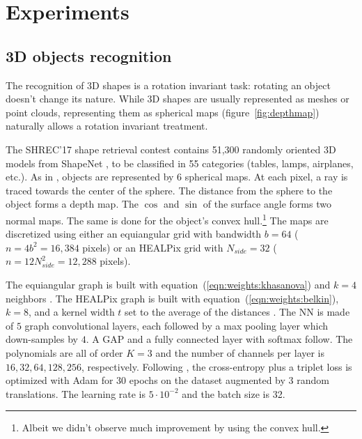 \documentclass{article} %
\newcommand{\todo}[1]{{\color[rgb]{.6,.1,.6}{#1}}}
\newcommand{\figref}[1]{figure~\ref{fig:#1}}
\newcommand{\eqnref}[1]{equation~(\ref{eqn:#1})}
\begin{document}
\section{Experiments}


\subsection{3D objects recognition} \label{sec:exp:shrec}

The recognition of 3D shapes is a rotation invariant task: rotating an object doesn't change its nature.
While 3D shapes are usually represented as meshes or point clouds, representing them as spherical maps (\figref{depthmap}) naturally allows a rotation invariant treatment.

The SHREC'17 shape retrieval contest \citep{shrec17} contains 51,300 randomly oriented 3D models from ShapeNet \citep{shapenet}, to be classified in 55 categories (tables, lamps, airplanes, etc.).
As in \citet{cohen2018sphericalcnn}, objects are represented by 6 spherical maps.
At each pixel, a ray is traced towards the center of the sphere.
The distance from the sphere to the object forms a depth map.
The $\cos$ and $\sin$ of the surface angle forms two normal maps.
The same is done for the object's convex hull.\footnote{Albeit we didn't observe much improvement by using the convex hull.}
The maps are discretized using either an equiangular grid with bandwidth $b = 64$ ($n = 4 b^2 = 16,384$ pixels) or an HEALPix grid with $N_{side} = 32$ ($n = 12 N_{side}^2 = 12,288$ pixels).

The equiangular graph is built with \eqnref{weights:khasanova} and $k = 4$ neighbors \citep[following][]{khasanova2017sphericalcnn}.
The HEALPix graph is built with \eqnref{weights:belkin}, $k = 8$, and a kernel width $t$ set to the average of the distances \citep[following][]{perraudin2019deepspherecosmo}.
The NN is made of $5$ graph convolutional layers, each followed by a max pooling layer which down-samples by $4$.
A GAP and a fully connected layer with softmax follow.
The polynomials are all of order $K=3$ and the number of channels per layer is $16, 32, 64, 128, 256$, respectively.
Following \citet{esteves2018sphericalcnn}, the cross-entropy plus a triplet loss is optimized with Adam for 30 epochs on the dataset augmented by 3 random translations.
The learning rate is $5 \cdot 10^{-2}$ and the batch size is 32.
\end{document}
